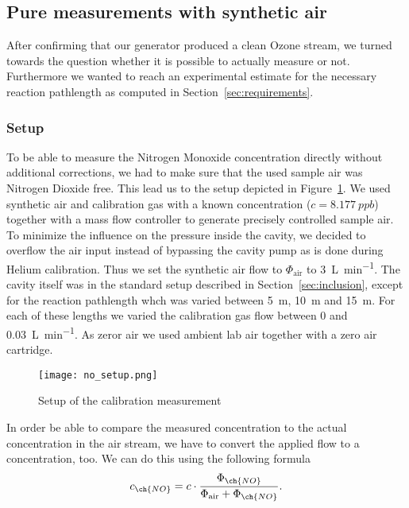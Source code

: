 \subsection{Pure  measurements with synthetic air}
\label{sec:no}

After confirming that our generator produced a clean Ozone stream, we
turned towards the question whether it is possible to actually measure
 or not. Furthermore we wanted to reach an experimental
estimate for the necessary reaction pathlength as computed in
Section~\ref{sec:requirements}.

\subsubsection{Setup}
\label{sec:no-setup}

To be able to measure the Nitrogen
Monoxide concentration directly without additional corrections, we had
to make sure that the used sample air was Nitrogen Dioxide free. This
lead us to the setup depicted in Figure~\ref{fig:no-setup}. We used
synthetic air and  calibration gas with a known  concentration ($c
= \SI{8.177}{ppb}$) together with a mass flow controller to generate
precisely controlled sample air. To minimize the influence on the
pressure inside the cavity, we decided to overflow the air input
instead of bypassing the cavity pump as is done during Helium
calibration. Thus we set the synthetic air flow to $\Phi_{\text{air}}$
to \SI{3}{\liter\per\minute}. The cavity itself was in the standard
setup described in Section~\ref{sec:inclusion}, except for the
reaction pathlength whch was varied between \SI{5}{\meter},
\SI{10}{\meter} and \SI{15}{\meter}. For each of these lengths we
varied the  calibration gas flow between \num{0} and
\SI{0.03}{\liter\per\minute}. As zeror air we used ambient lab air
together with a zero air cartridge.

\begin{figure}[htbp]
  \centering
  \texttt{[image: no\_setup.png]}
  \caption{Setup of the calibration measurement}
  \label{fig:no-setup}
\end{figure}

In order be able to compare the measured  concentration to the
actual concentration in the air stream, we have to convert the applied
 flow to a concentration, too. We can do this using the
following formula
\begin{align}
  c_{\ch{NO}} = c \cdot \frac{\Phi_{\ch{NO}}}{\Phi_{\text{air}} +
  \Phi_{\ch{NO}}}. \label{eq:c-flow}
\end{align}

